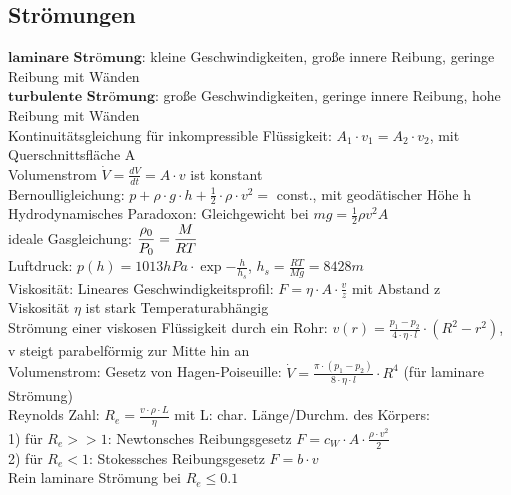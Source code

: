 \documentclass[fs, footer]{latex4ei}
\begin{document}
\begin{multicols*}{4}
\subsection{Strömungen}
$\textbf{laminare Strömung:}$ kleine Geschwindigkeiten, große innere Reibung, geringe Reibung mit Wänden\\
$\textbf{turbulente Strömung:}$ große Geschwindigkeiten, geringe innere Reibung, hohe Reibung mit Wänden\\

Kontinuitätsgleichung für inkompressible Flüssigkeit: $A_1\cdot v_1 = A_2\cdot v_2$, mit Querschnittsfläche A\\
Volumenstrom $\dot V = \frac{dV}{dt} = A\cdot v$ ist konstant\\
Bernoulligleichung: $p + \rho\cdot g\cdot h + \frac{1}{2}\cdot \rho\cdot v^2 =$ const., mit geodätischer Höhe h\\
Hydrodynamisches Paradoxon: Gleichgewicht bei $mg = \iffalse $p_{\text{atm}}\cdot A - p_1\cdot A =$ \fi
\frac{1}{2} \rho  v^2  A$\\ 
ideale Gasgleichung: $ \dfrac{\rho _0}{P_0} = \dfrac{M}{RT}$\\
Luftdruck: $p(h) = 1013hPa\cdot\exp{-\frac{h}{h_s}}$, $h_s = \frac{RT}{Mg} = 8428m$\\

Viskosität: Lineares Geschwindigkeitsprofil: $F = \eta\cdot A\cdot\frac{v}{z}$ mit Abstand z\\
Viskosität $\eta$ ist stark Temperaturabhängig\\

Strömung einer viskosen Flüssigkeit durch ein Rohr: $v(r) = \frac{p_1-p_2}{4\cdot\eta\cdot l}\cdot(R^2-r^2)$, v steigt parabelförmig zur Mitte hin an\\
Volumenstrom: %
Gesetz von Hagen-Poiseuille: $\dot V  = \frac{\pi\cdot(p_1-p_2)}{8\cdot\eta\cdot l}\cdot R^4$ (für laminare Strömung)\\

Reynolds Zahl: $R_e = \frac{v \cdot\rho \cdot L}{\eta}$ mit L: char. Länge/Durchm. des Körpers:\\ 
1) für $R_e >> 1$: Newtonsches Reibungsgesetz $F = c_W \cdot A \cdot \frac{\rho\cdot v^2}{2}$\\
2) für $R_e < 1$: Stokessches Reibungsgesetz $F = b\cdot v$\\
Rein laminare Strömung bei $R_e \leq 0.1$\\






\end{multicols*}
\end{document}
